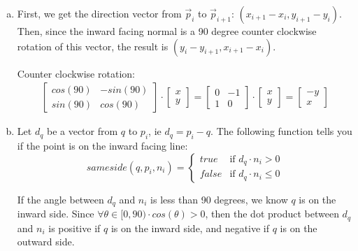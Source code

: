 \documentclass{article} %
\begin{document}
\begin{enumerate}[a)]

\item

First, we get the direction vector from $\vec{p}_i$ to $\vec{p}_{i+1}$: $(x_{i+1} - x_i, y_{i+1} - y_i)$. Then, since the inward facing normal is a 90 degree counter clockwise rotation of this vector, the result is $(y_i - y_{i+1}, x_{i+1} - x_i)$.

Counter clockwise rotation:
\begin{align*}
\left[
\begin{matrix}
cos(90) & -sin(90)\\
sin(90) & cos(90)
\end{matrix}
\right]
\cdot
\left[
\begin{matrix}
x\\
y
\end{matrix}
\right] = \left[
\begin{matrix}
0 & -1\\
1 & 0
\end{matrix}
\right]
\cdot
\left[
\begin{matrix}
x\\
y
\end{matrix}
\right] = \left[
\begin{matrix}
-y\\
x
\end{matrix}
\right]
\end{align*}

\item
Let $d_q$ be a vector from $q$ to $p_i$, ie $d_q = p_i - q$. The following function tells you if the point is on the inward facing line:
\[
sameside(q, p_i, n_i) =
\begin{cases}
true & \text{if } d_q \cdot n_i > 0\\
false & \text{if } d_q \cdot n_i \leq 0
\end{cases}
\]

If the angle between $d_q$ and $n_i$ is less than 90 degrees, we know $q$ is on the inward side. Since $\forall \theta \in [0,90) \cdot cos(\theta) > 0$, then the dot product between $d_q$ and $n_i$ is positive if $q$ is on the inward side, and negative if $q$ is on the outward side.


\end{enumerate}
\end{document}
